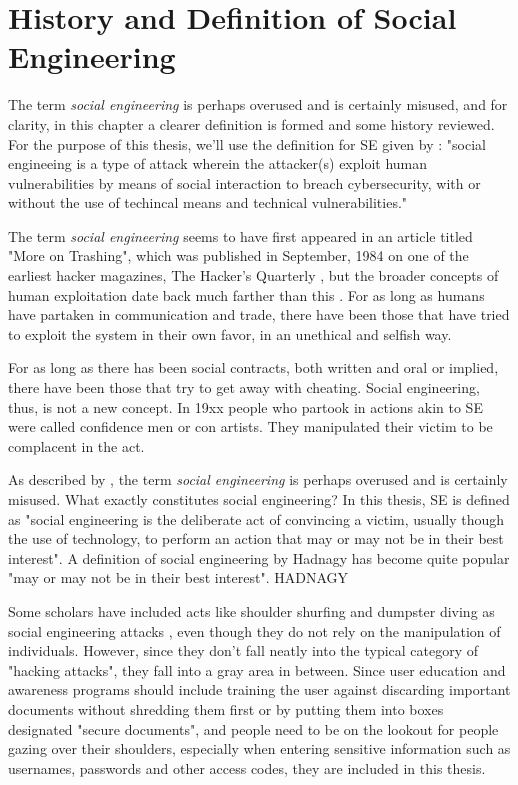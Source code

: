 \chapter{History and Definition of Social Engineering\label{definition}}

The term \textit{social engineering} is perhaps overused and is certainly misused, and for clarity, in this chapter a clearer definition is formed and some history reviewed. For the purpose of this thesis, we'll use the definition for SE given by \cite{wang_defining_2020}: "social engineeing is a type of attack wherein the attacker(s) exploit human vulnerabilities by means of social interaction to breach cybersecurity, with or without the use of techincal means and technical vulnerabilities."

The term \textit{social engineering} seems to have first appeared in an article titled "More on Trashing", which was published in September, 1984 on one of the earliest hacker magazines, The Hacker's Quarterly \citep{wang_defining_2020}, but the broader concepts of human exploitation date back much farther than this \citep{qin_investigation_2007}. For as long as humans have partaken in communication and trade, there have been those that have tried to exploit the system in their own favor, in an unethical and selfish way.


For as long as there has been social contracts, both written and oral or implied, there have been those that try to get away with cheating. Social engineering, thus, is not a new concept. In 19xx people who partook in actions akin to SE were called confidence men or con artists. They manipulated their victim to be complacent in the act.

As described by \cite{abiteboul}, the term \textit{social engineering} is perhaps overused and is certainly misused. What exactly constitutes social engineering? In this thesis, SE is defined as "social engineering is the deliberate act of convincing a victim, usually though the use of technology, to perform an action that may or may not be in their best interest". A definition of social engineering by Hadnagy has become quite popular "may or may not be in their best interest". HADNAGY

Some scholars have included acts like shoulder shurfing and dumpster diving as social engineering attacks \citep{abiteboul}, even though they do not rely on the manipulation of individuals.  However, since they don't fall neatly into the typical category of "hacking attacks", they fall into a gray area in between. Since user education and awareness programs should include training the user against discarding important documents without shredding them first or by putting them into boxes designated "secure documents", and people need to be on the lookout for people gazing over their shoulders, especially when entering sensitive information such as usernames, passwords and other access codes, they are included in this thesis.

